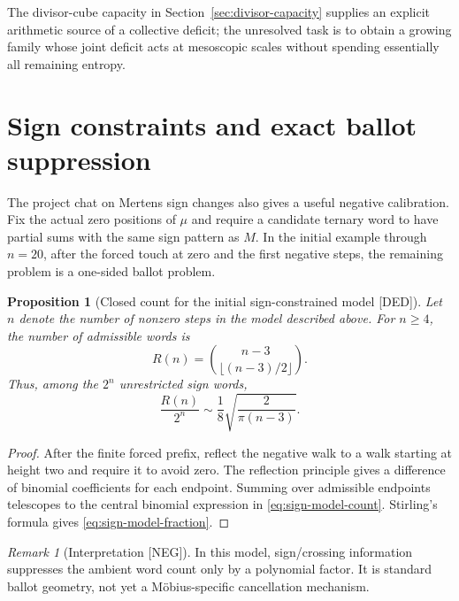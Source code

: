 \documentclass[11pt]{amsart}
\numberwithin{equation}{section}
\theoremstyle{plain}
\newtheorem{proposition}[theorem]{Proposition}
\theoremstyle{definition}
\theoremstyle{remark}
\newtheorem{remark}[theorem]{Remark}
\newcommand{\Mert}{M}
\newcommand{\Mob}{\mu}
\newcommand{\DED}{\textup{[DED]}}
\newcommand{\NEG}{\textup{[NEG]}}
\begin{document}
The divisor-cube capacity in Section~\ref{sec:divisor-capacity} supplies an explicit arithmetic source of a collective deficit;
the unresolved task is to obtain a growing family whose joint deficit acts at mesoscopic scales without spending essentially all
remaining entropy.

\section{Sign constraints and exact ballot suppression}
\label{sec:sign-constrained-words}

The project chat on Mertens sign changes also gives a useful negative calibration.  Fix the actual zero positions of $\Mob$ and
require a candidate ternary word to have partial sums with the same sign pattern as $\Mert$.  In the initial example through
$n=20$, after the forced touch at zero and the first negative steps, the remaining problem is a one-sided ballot problem.

\begin{proposition}[Closed count for the initial sign-constrained model \DED]
\label{prop:sign-model-count}
Let $n$ denote the number of nonzero steps in the model described above.  For $n\ge4$, the number of admissible words is
\begin{equation}
R(n)=\binom{n-3}{\lfloor(n-3)/2\rfloor}.
\label{eq:sign-model-count}
\end{equation}
Thus, among the $2^n$ unrestricted sign words,
\begin{equation}
\frac{R(n)}{2^n}
\sim
\frac18\sqrt{\frac{2}{\pi(n-3)}}.
\label{eq:sign-model-fraction}
\end{equation}
\end{proposition}

\begin{proof}
After the finite forced prefix, reflect the negative walk to a walk starting at height two and require it to avoid zero.  The
reflection principle gives a difference of binomial coefficients for each endpoint.  Summing over admissible endpoints telescopes
to the central binomial expression in \eqref{eq:sign-model-count}.  Stirling's formula gives
\eqref{eq:sign-model-fraction}.
\end{proof}

\begin{remark}[Interpretation \NEG]
\label{rem:sign-model-negative}
In this model, sign/crossing information suppresses the ambient word count only by a polynomial factor.  It is standard ballot
geometry, not yet a M\"obius-specific cancellation mechanism.
\end{remark}
\end{document}
